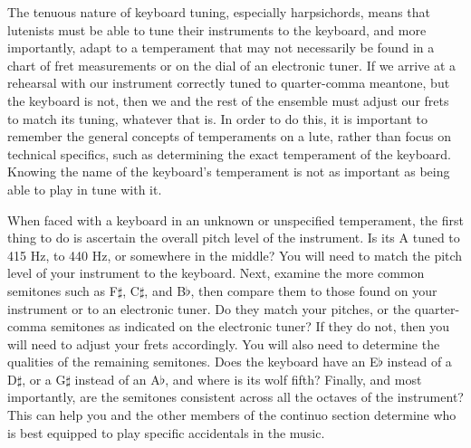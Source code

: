 The tenuous nature of keyboard tuning, especially harpsichords, means that lutenists must be able to tune their instruments
to the keyboard, and more importantly, adapt to a temperament that may not necessarily be found
in a chart of fret measurements or on the dial of an electronic tuner.  If we arrive at a rehearsal
with our instrument correctly tuned to quarter-comma meantone, but the keyboard is not, then
we and the rest of the ensemble must adjust our frets to match its tuning, whatever that is.
In order to do this, it is important to remember the general concepts of temperaments on a lute,
rather than focus on technical specifics, such as determining the exact temperament of the 
keyboard.  Knowing the name of the keyboard's temperament is not as important as being able to
play in tune with it.

When faced with a keyboard in an unknown or unspecified temperament, the first thing to do is
ascertain the overall pitch level of the instrument.  Is its A tuned to 415 Hz, to 440 Hz, or
somewhere in the middle?  You will need to match the pitch level of your instrument to the keyboard.
Next, examine the more common semitones such as F$\sharp$, C$\sharp$, and B$\flat$, then compare
them to those found on your instrument or to an electronic tuner.  Do they match your pitches, or
the quarter-comma semitones as indicated on the electronic tuner?  If they do not, then you will
need to adjust your frets accordingly.  You will also need to determine the qualities of the
remaining semitones.  Does the keyboard have an E$\flat$ instead of a D$\sharp$, or a G$\sharp$
instead of an A$\flat$, and where is its wolf fifth?  Finally, and most importantly, are the
semitones consistent across all the octaves of the instrument?  This can help you and the other
members of the continuo section determine who is best equipped to play specific accidentals in the
music.

